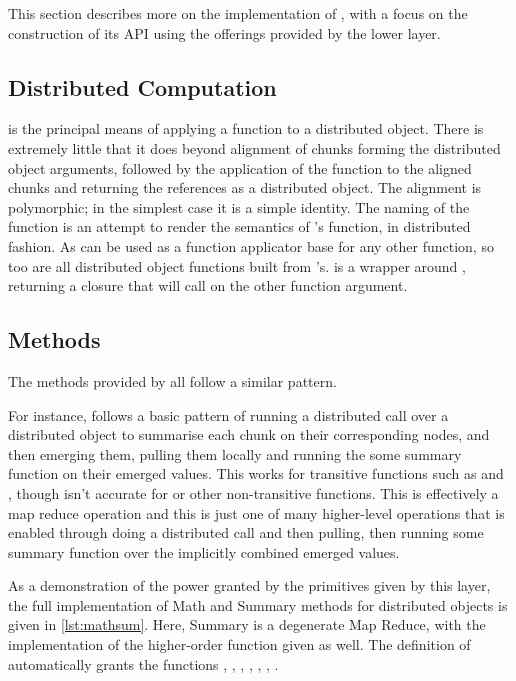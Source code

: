 This section describes more on the implementation of \lso{}, with a focus on the construction of its API using the offerings provided by the lower layer.

\subsection{Distributed Computation}

 is the principal means of applying a function to a distributed object.
There is extremely little that it does beyond alignment of chunks forming the distributed object arguments, followed by the application of the function to the aligned chunks and returning the references as a distributed object.
The alignment is polymorphic; in the simplest case it is a simple identity.
The naming of the function is an attempt to render the semantics of \R{}'s  function, in distributed fashion.
As  can be used as a function applicator base for any other function, so too are all distributed object functions built from 's.
 is a wrapper around , returning a closure that will call  on the other function argument.

\subsection{Methods}

The methods provided by \lso{} all follow a similar pattern.

For instance,  follows a basic pattern of running a distributed call over a distributed object to summarise each chunk on their corresponding nodes, and then emerging them, pulling them locally and running the some summary function on their  emerged values.
This works for transitive functions such as  and , though isn't accurate for  or other non-transitive functions.
This is effectively a map reduce operation and this is just one of many higher-level operations that is enabled through doing a distributed call and then pulling, then running some summary function over the implicitly combined emerged values.

As a demonstration of the power granted by the primitives given by this layer, the full implementation of Math and Summary methods for distributed objects is given in \cref{lst:mathsum}.
Here, Summary is a degenerate Map Reduce, with the implementation of the higher-order  function given as well.
The definition of  automatically grants the functions , , , , , , .

